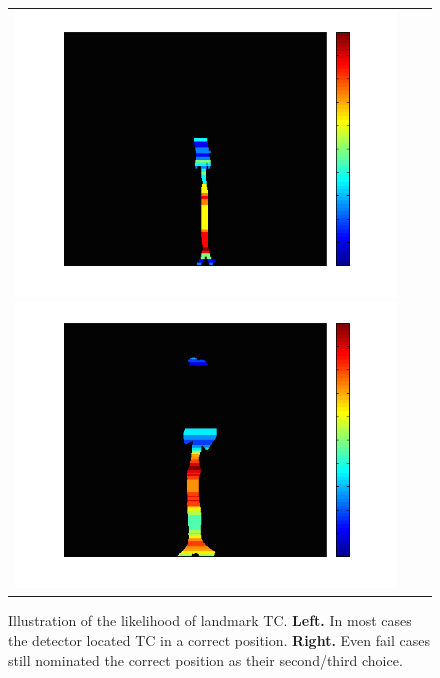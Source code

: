 \begin{figure}[tb]
  \begin{center}
    \begin{tabular}{ccc}
    \includegraphics[width=\figwidth] {fig/CRL02_TracheaCarina_left.png}
    \includegraphics[width=\figwidth] {fig/CRL04_TracheaCarina_left.png}
    \end{tabular}
    \caption{ \label{fig:landmark_detection} Illustration of the likelihood of landmark TC. {\bf Left.} In most cases the detector located TC in a correct position. {\bf Right.} Even fail cases still nominated the correct position as their second/third choice.
    }
  \end{center}
\end{figure}


